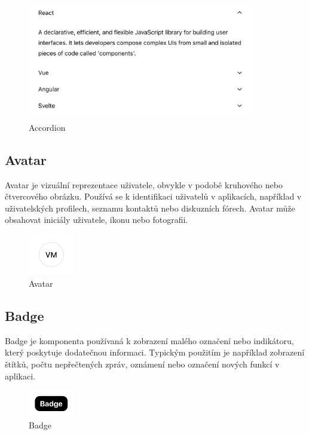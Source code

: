 \begin{figure}[H]
  \centering
  \includegraphics[width=10cm]{images/accordion}
  \captionsetup{justification=centering,margin=2cm}
  \caption{Accordion} \label{picture:accordion}
\end{figure}

\subsection{Avatar}
Avatar je vizuální reprezentace uživatele, obvykle v podobě kruhového nebo čtvercového obrázku. Používá se k identifikaci uživatelů v aplikacích, například v uživatelských profilech, seznamu kontaktů nebo diskuzních fórech. Avatar může obsahovat iniciály uživatele, ikonu nebo fotografii.

\begin{figure}[H]
  \centering
  \includegraphics[width=2cm]{images/avatar}
  \captionsetup{justification=centering,margin=2cm}
  \caption{Avatar} \label{picture:avatar}
\end{figure}

\subsection{Badge}
Badge je komponenta používaná k zobrazení malého označení nebo indikátoru, který poskytuje dodatečnou informaci. Typickým použitím je například zobrazení štítků, počtu nepřečtených zpráv, oznámení nebo označení nových funkcí v aplikaci.

\begin{figure}[H]
  \centering
  \includegraphics[width=2cm]{images/badge}
  \captionsetup{justification=centering,margin=2cm}
  \caption{Badge} \label{picture:badge}
\end{figure}

